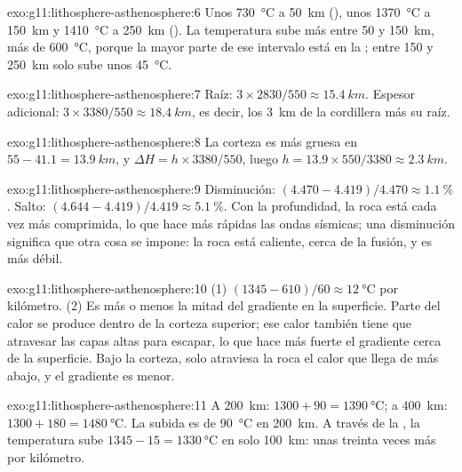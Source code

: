 \begin{solution}{exo:g11:lithosphere-asthenosphere:6}
Unos \qty{730}{\celsius} a \qty{50}{km} (), unos
\qty{1370}{\celsius} a \qty{150}{km} y \qty{1410}{\celsius} a
\qty{250}{km} (). La temperatura sube más entre 50 y
\qty{150}{km}, más de \qty{600}{\celsius}, porque la mayor parte de ese
intervalo está en la ; entre 150 y \qty{250}{km} solo sube unos
\qty{45}{\celsius}.
\end{solution}

\begin{solution}{exo:g11:lithosphere-asthenosphere:7}
Raíz: $3 \times 2830/550 \approx \qty{15.4}{km}$. Espesor adicional:
$3 \times 3380/550 \approx \qty{18.4}{km}$, es decir, los \qty{3}{km} de la
cordillera más su raíz.
\end{solution}

\begin{solution}{exo:g11:lithosphere-asthenosphere:8}
La corteza es más gruesa en $55 - 41.1 = \qty{13.9}{km}$, y $\Delta H = h
\times 3380/550$, luego $h = 13.9 \times 550/3380 \approx \qty{2.3}{km}$.
\end{solution}

\begin{solution}{exo:g11:lithosphere-asthenosphere:9}
Disminución: $(4.470 - 4.419)/4.470 \approx \qty{1.1}{\percent}$. Salto:
$(4.644 - 4.419)/4.419 \approx \qty{5.1}{\percent}$. Con la profundidad, la
roca está cada vez más comprimida, lo que hace más rápidas las ondas
sísmicas; una disminución significa que otra cosa se impone: la roca está
caliente, cerca de la fusión, y es más débil.
\end{solution}

\begin{solution}{exo:g11:lithosphere-asthenosphere:10}
(1) $(1345 - 610)/60 \approx \qty{12}{\celsius}$ por kilómetro. (2) Es más o
menos la mitad del gradiente en la superficie. Parte del calor se produce
dentro de la corteza superior; ese calor también tiene que atravesar las
capas altas para escapar, lo que hace más fuerte el gradiente cerca de la
superficie. Bajo la corteza, solo atraviesa la roca el calor que llega de más
abajo, y el gradiente es menor.
\end{solution}

\begin{solution}{exo:g11:lithosphere-asthenosphere:11}
A \qty{200}{km}: $1300 + 90 = \qty{1390}{\celsius}$; a \qty{400}{km}:
$1300 + 180 = \qty{1480}{\celsius}$. La subida es de \qty{90}{\celsius} en
\qty{200}{km}. A través de la , la temperatura sube
$1345 - 15 = \qty{1330}{\celsius}$ en solo \qty{100}{km}: unas treinta veces
más por kilómetro.
\end{solution}

